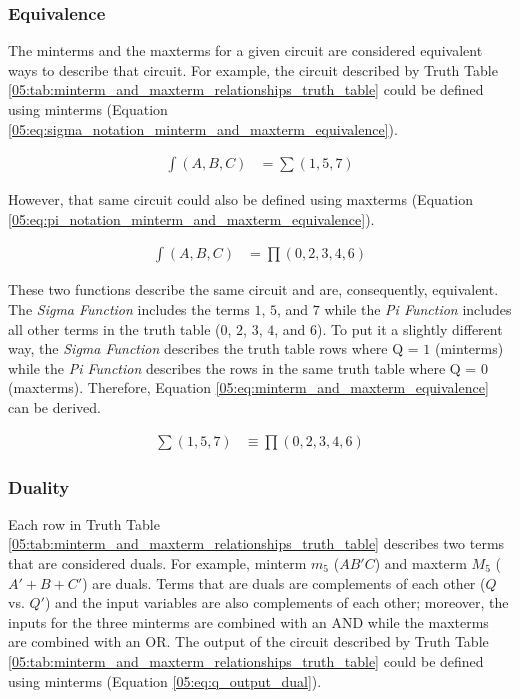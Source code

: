 \subsubsection{Equivalence}
\label{05:subsubsec:equivalence}

The minterms and the maxterms for a given circuit are considered equivalent ways to describe that circuit. For example, the circuit described by Truth Table \ref{05:tab:minterm_and_maxterm_relationships_truth_table} could be defined using minterms (Equation \ref{05:eq:sigma_notation_minterm_and_maxterm_equivalence}).

\begin{align}
  \label{05:eq:sigma_notation_minterm_and_maxterm_equivalence}
  \int(A,B,C) &= \sum(1,5,7)
\end{align}

However, that same circuit could also be defined using maxterms (Equation \ref{05:eq:pi_notation_minterm_and_maxterm_equivalence}).

\begin{align}
  \label{05:eq:pi_notation_minterm_and_maxterm_equivalence}
  \int(A,B,C) &= \prod(0,2,3,4,6)
\end{align}

These two functions describe the same circuit and are, consequently, equivalent. The \emph{Sigma Function} includes the terms $ 1 $, $ 5 $, and $ 7 $ while the \emph{Pi Function} includes all other terms in the truth table ($ 0 $, $ 2 $, $ 3 $, $ 4 $, and $ 6 $). To put it a slightly different way, the \emph{Sigma Function} describes the truth table rows where Q = $ 1 $ (minterms) while the \emph{Pi Function} describes the rows in the same truth table where Q =  $ 0 $ (maxterms). Therefore, Equation \ref{05:eq:minterm_and_maxterm_equivalence} can be derived.

\begin{align}
  \label{05:eq:minterm_and_maxterm_equivalence}
  \sum(1,5,7) &\equiv \prod(0,2,3,4,6)
\end{align}

\subsubsection{Duality}
\label{05:subsubsec:duality}

Each row in Truth Table \ref{05:tab:minterm_and_maxterm_relationships_truth_table} describes two terms that are considered duals. For example, minterm $ m_5 $ ($ AB'C $) and maxterm $ M_5 $ ($ A'+B+C' $) are duals. Terms that are duals are complements of each other ($ Q $ vs. $ Q' $) and the input variables are also complements of each other; moreover, the inputs for the three minterms are combined with an \textsf{AND}  while the maxterms are combined with an \textsf{OR}. The output of the circuit described by Truth Table \ref{05:tab:minterm_and_maxterm_relationships_truth_table} could be defined using minterms (Equation \ref{05:eq:q_output_dual}).

